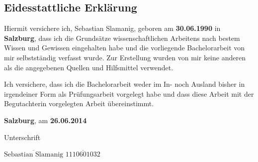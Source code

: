 \subsection*{Eidesstattliche Erklärung}

Hiermit versichere ich, Sebastian Slamanig, geboren am {\bf 30.06.1990} in {\bf Salzburg}, dass ich die Grundsätze wissenschaftlichen Arbeitens nach bestem Wissen und Gewissen eingehalten habe und die vorliegende Bachelorarbeit von mir selbstständig verfasst wurde. Zur Erstellung wurden von mir keine anderen als die angegebenen Quellen und Hilfsmittel verwendet. 

Ich versichere, dass ich die Bachelorarbeit weder im In- noch Ausland bisher in irgendeiner Form als Prüfungsarbeit vorgelegt habe und dass diese Arbeit mit der Begutachterin vorgelegten Arbeit übereinstimmt.


\vspace*{3cm}

{\bf Salzburg}, am {\bf 26.06.2014}


\hfill


Unterschrift

\vspace*{1cm}

$\overline{\text{Sebastian Slamanig}}$ \hfill	$\overline{\text{1110601032}}$


